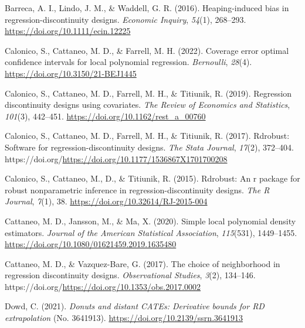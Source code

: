 \documentclass[
  11pt,
]{article}
\newlength{\cslhangindent}
\newlength{\cslentryspacingunit} %
\newenvironment{CSLReferences}[2] %
 {%
  \setlength{\parindent}{0pt}
  \ifodd #1
  \let\oldpar\par
  \def\par{\hangindent=\cslhangindent\oldpar}
  \fi
  \setlength{\parskip}{#2\cslentryspacingunit}
 }%
 {}
\begin{document}
\hypertarget{refs}{}
\begin{CSLReferences}{1}{0}
\leavevmode{}%
Barreca, A. I., Lindo, J. M., \& Waddell, G. R. (2016). Heaping-induced
bias in regression-discontinuity designs. \emph{Economic Inquiry},
\emph{54}(1), 268--293. \url{https://doi.org/10.1111/ecin.12225}

\leavevmode{}%
Calonico, S., Cattaneo, M. D., \& Farrell, M. H. (2022). Coverage error
optimal confidence intervals for local polynomial regression.
\emph{Bernoulli}, \emph{28}(4). \url{https://doi.org/10.3150/21-BEJ1445}

\leavevmode{}%
Calonico, S., Cattaneo, M. D., Farrell, M. H., \& Titiunik, R. (2019).
Regression discontinuity designs using covariates. \emph{The Review of
Economics and Statistics}, \emph{101}(3), 442--451.
\url{https://doi.org/10.1162/rest_a_00760}

\leavevmode{}%
Calonico, S., Cattaneo, M. D., Farrell, M. H., \& Titiunik, R. (2017).
Rdrobust: Software for regression-discontinuity designs. \emph{The Stata
Journal}, \emph{17}(2), 372--404.
https://doi.org/\url{https://doi.org/10.1177/1536867X1701700208}

\leavevmode{}%
Calonico, S., Cattaneo, M., D., \& Titiunik, R. (2015). Rdrobust: An r
package for robust nonparametric inference in regression-discontinuity
designs. \emph{The R Journal}, \emph{7}(1), 38.
\url{https://doi.org/10.32614/RJ-2015-004}

\leavevmode{}%
Cattaneo, M. D., Jansson, M., \& Ma, X. (2020). Simple local polynomial
density estimators. \emph{Journal of the American Statistical
Association}, \emph{115}(531), 1449--1455.
\url{https://doi.org/10.1080/01621459.2019.1635480}

\leavevmode{}%
Cattaneo, M. D., \& Vazquez-Bare, G. (2017). The choice of neighborhood
in regression discontinuity designs. \emph{Observational Studies},
\emph{3}(2), 134--146.
https://doi.org/\url{https://doi.org/10.1353/obs.2017.0002}

\leavevmode{}%
Dowd, C. (2021). \emph{Donuts and distant {CATEs}: Derivative bounds for
{RD} extrapolation} (No. 3641913).
\url{https://doi.org/10.2139/ssrn.3641913}


\end{CSLReferences}
\end{document}
